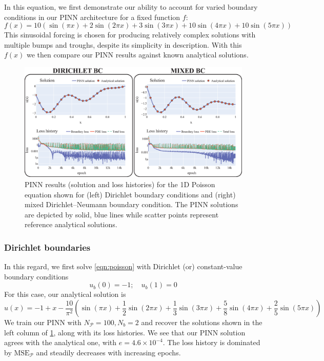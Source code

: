 \documentclass[11pt]{article}
\newcommand{\mse}{\textrm{MSE}}
\newcommand{\pde}{\ensuremath{\mathcal{P}}}
\begin{document}
In this equation, we first demonstrate our ability to account for varied boundary
conditions in our PINN architecture for a fixed function \(f\):
\[ f(x) = 10 \left(\sin(\pi x) + 2\sin(2\pi x) + 3\sin(3\pi x) + 10\sin(4\pi
   x) + 10\sin(5\pi x)\right) \]
This sinusoidal forcing is chosen for producing relatively complex
solutions with multiple bumps and troughs, despite its simplicity in description.
With this \(f(x)\) we then compare our PINN results against known
analytical solutions.
\begin{figure}[htbp]
\centering
\includegraphics[width=1.0\textwidth]{images/poisson.eps}
\caption{\label{fig:poisson_results}PINN results (solution and loss histories) for the 1D Poisson equation shown for (left) Dirichlet boundary conditions and (right) mixed Dirichlet--Neumann boundary condition. The PINN solutions are depicted by solid, blue lines while scatter points represent reference analytical solutions.}
\end{figure}

\subsubsection{Dirichlet boundaries}
\label{sec:org8aa119b}
In this regard, we first solve \cref{eqn:poisson} with Dirichlet (or) constant-value
boundary conditions
\[ u_b(0) = -1 ;\quad  u_b(1) = 0\]
For this case, our analytical solution is
\[ \hat{u}(x) = -1 + x - \frac{10}{\pi^2} \left(\sin(\pi x) + \frac{1}{2}\sin(2\pi x) + \frac{1}{3}\sin(3\pi x) + \frac{5}{8}\sin(4\pi
	x) + \frac{2}{5}\sin(5\pi x)\right) \]
We train our PINN with \(N_\pde = 100 , N_b = 2\) and recover the solutions
shown in the left column of \cref{fig:poisson_results}, along with its loss
histories. We see that our PINN
solution agrees with the analytical one,
with \(e = 4.6 \times 10^{-4}\). The loss history is dominated by \(\mse_\pde\) and steadily decreases with increasing epochs.
\end{document}
